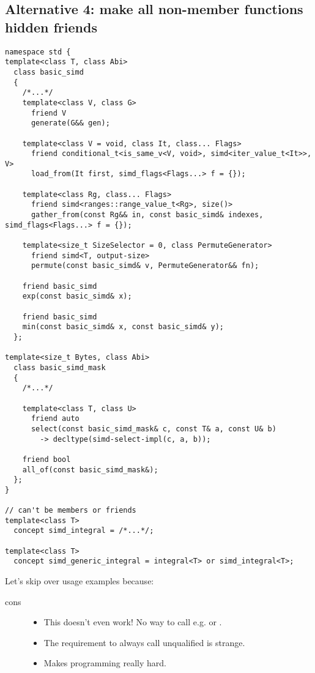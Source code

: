 \subsection{Alternative 4: make all non-member functions hidden friends}

\medskip\begin{lstlisting}[style=Vc]
namespace std {
template<class T, class Abi>
  class basic_simd
  {
    /*...*/
    template<class V, class G>
      friend V
      generate(G&& gen);

    template<class V = void, class It, class... Flags>
      friend conditional_t<is_same_v<V, void>, simd<iter_value_t<It>>, V>
      load_from(It first, simd_flags<Flags...> f = {});

    template<class Rg, class... Flags>
      friend simd<ranges::range_value_t<Rg>, size()>
      gather_from(const Rg&& in, const basic_simd& indexes, simd_flags<Flags...> f = {});

    template<size_t SizeSelector = 0, class PermuteGenerator>
      friend simd<T, output-size>
      permute(const basic_simd& v, PermuteGenerator&& fn);

    friend basic_simd
    exp(const basic_simd& x);

    friend basic_simd
    min(const basic_simd& x, const basic_simd& y);
  };

template<size_t Bytes, class Abi>
  class basic_simd_mask
  {
    /*...*/

    template<class T, class U>
      friend auto
      select(const basic_simd_mask& c, const T& a, const U& b)
        -> decltype(simd-select-impl(c, a, b));

    friend bool
    all_of(const basic_simd_mask&);
  };
}

// can't be members or friends
template<class T>
  concept simd_integral = /*...*/;

template<class T>
  concept simd_generic_integral = integral<T> or simd_integral<T>;
\end{lstlisting}

Let's skip over usage examples because:

\begin{description}
  \item[cons]
    \begin{itemize}
      \item This doesn't even work!
        No way to call e.g.  or .
      \item The requirement to always call unqualified is strange.
      \item Makes \simdgeneric programming really hard.
    \end{itemize}
\end{description}

